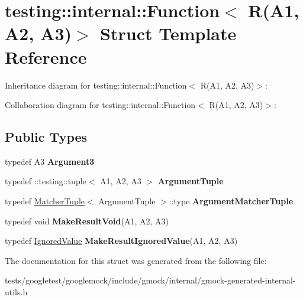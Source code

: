 \hypertarget{structtesting_1_1internal_1_1Function_3_01R_07A1_00_01A2_00_01A3_08_4}{}\section{testing\+:\+:internal\+:\+:Function$<$ R(A1, A2, A3)$>$ Struct Template Reference}
\label{structtesting_1_1internal_1_1Function_3_01R_07A1_00_01A2_00_01A3_08_4}


Inheritance diagram for testing\+:\+:internal\+:\+:Function$<$ R(A1, A2, A3)$>$\+:


Collaboration diagram for testing\+:\+:internal\+:\+:Function$<$ R(A1, A2, A3)$>$\+:
\subsection*{Public Types}
\begin{DoxyCompactItemize}
\item 
\mbox{\label{structtesting_1_1internal_1_1Function_3_01R_07A1_00_01A2_00_01A3_08_4_a2ac6eefb33feafe85c1c6742bdab509f}} 
typedef A3 {\bfseries Argument3}
\item 
\mbox{\label{structtesting_1_1internal_1_1Function_3_01R_07A1_00_01A2_00_01A3_08_4_a6f1e1097947a9e13a4e29099a61de804}} 
typedef \+::testing\+::tuple$<$ A1, A2, A3 $>$ {\bfseries Argument\+Tuple}
\item 
\mbox{\label{structtesting_1_1internal_1_1Function_3_01R_07A1_00_01A2_00_01A3_08_4_acb08fa0fffe1213ce88f53343bb3b564}} 
typedef \hyperlink{structtesting_1_1internal_1_1MatcherTuple}{Matcher\+Tuple}$<$ Argument\+Tuple $>$\+::type {\bfseries Argument\+Matcher\+Tuple}
\item 
\mbox{\label{structtesting_1_1internal_1_1Function_3_01R_07A1_00_01A2_00_01A3_08_4_a6b9f583a9ef6755cc92ce2b7fa255b84}} 
typedef void {\bfseries Make\+Result\+Void}(A1, A2, A3)
\item 
\mbox{\label{structtesting_1_1internal_1_1Function_3_01R_07A1_00_01A2_00_01A3_08_4_abff7468ae8231766e7b396c8a407cb5a}} 
typedef \hyperlink{classtesting_1_1internal_1_1IgnoredValue}{Ignored\+Value} {\bfseries Make\+Result\+Ignored\+Value}(A1, A2, A3)
\end{DoxyCompactItemize}


The documentation for this struct was generated from the following file\+:\begin{DoxyCompactItemize}
\item 
tests/googletest/googlemock/include/gmock/internal/gmock-\/generated-\/internal-\/utils.\+h\end{DoxyCompactItemize}
